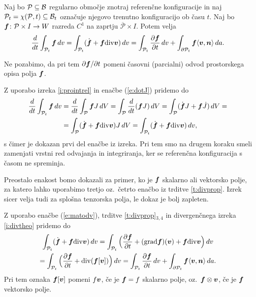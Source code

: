 \begin{izrek} \label{i:transport}
	Naj bo $\mathcal{P}\subseteq \mathcal B$ regularno območje znotraj referenčne konfiguracije in naj
	$\mathcal{P}_t=\chi(\mathcal{P},t)\subseteq \mathcal B_t$ označuje njegovo trenutno konfiguracijo ob času $t$.
	Naj bo $\boldsymbol f\colon \mathcal{P}\times I\to W$ razreda $C^1$ na zaprtju $\overline{\mathcal{P}}\times I$.
	Potem velja
	\begin{equation*}
		\frac{d}{dt}\int_{\mathcal{P}_t}\boldsymbol f\,dv =
		\int_{\mathcal{P}_t}(\dot{\boldsymbol f}+\boldsymbol f\mathrm{div}\boldsymbol v)\,dv=
		\int_{\mathcal{P}_t}\frac{\partial\boldsymbol f}{\partial t}\,dv +
		\int_{\partial \mathcal{P}_t}\boldsymbol f\langle\boldsymbol v,\boldsymbol n\rangle\,da.
	\end{equation*}
\end{izrek}
Ne pozabimo, da pri tem $\partial\boldsymbol f/\partial t$ pomeni časovni (parcialni)
odvod prostorskega opisa polja $\boldsymbol f$.

\proof
	Z uporabo izreka \ref{i:prointrel} in enačbe (\ref{e:dotJ}) pridemo do
	\begin{align*}
		\frac{d}{dt}\int_{\mathcal{P}_t}\boldsymbol f\,dv &= \frac{d}{dt}\int_{\mathcal{P}}\boldsymbol fJ\,dV =
		\int_{\mathcal{P}}\frac{d}{dt}(\boldsymbol fJ)\,dV = \int_{\mathcal{P}}(\dot{\boldsymbol f}J+\boldsymbol f\dot{J})\,dV =\\
		&=\int_{\mathcal{P}}(\dot{\boldsymbol f}+\boldsymbol f\mathrm{div}\boldsymbol v)J\,dV = \int_{\mathcal{P}_t}(\dot{\boldsymbol f}+\boldsymbol f\mathrm{div}\boldsymbol v)\,dv,
	\end{align*}
	s čimer je dokazan prvi del enačbe iz izreka.
	Pri tem smo na drugem koraku smeli zamenjati vrstni red odvajanja in integriranja,
	ker se referenčna konfiguracija s časom ne spreminja.
	
	Preostalo enakost bomo dokazali za primer, ko je $\boldsymbol f$ skalarno ali vektorsko
	polje, za katero lahko uporabimo tretjo oz.~četrto enačbo iz trditve \ref{t:divprop}.
	Izrek sicer velja tudi za splošna tenzorska polja, le dokaz je bolj zapleten.
	
	Z uporabo enačbe (\ref{e:matodv}), trditve \ref{t:divprop}$_{3,4}$
	in divergenčnega izreka \ref{i:divtheo} pridemo do
	\begin{multline*}
		\int_{\mathcal{P}_t}(\dot{\boldsymbol f}+\boldsymbol f\mathrm{div}\boldsymbol v)\,dv
		=\int_{\mathcal{P}_t}\Big(\frac{\partial\boldsymbol f}{\partial t}+
		(\mathrm{grad}\boldsymbol f)(\boldsymbol v)+\boldsymbol f\mathrm{div}\boldsymbol v\Big)\,dv \\
		=\int_{\mathcal{P}_t}\Big(\frac{\partial\boldsymbol f}{\partial t}+\mathrm{div}(\boldsymbol f[\boldsymbol v])\Big)\,dv
		=\int_{\mathcal{P}_t}\frac{\partial\boldsymbol f}{\partial t}\,dv+
		\int_{\partial \mathcal{P}_t}\boldsymbol f\langle\boldsymbol v,\boldsymbol n\rangle\,da.
	\end{multline*}
	Pri tem oznaka $\boldsymbol f[\boldsymbol v]$ pomeni $f\boldsymbol v$, če je $\boldsymbol f=f$ skalarno polje,
	oz.~$\boldsymbol f\otimes\boldsymbol v$, če je $\boldsymbol f$ vektorsko polje.
\endproof


